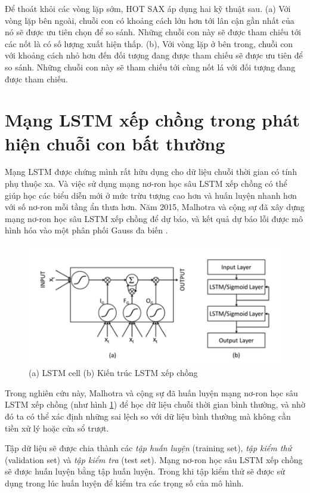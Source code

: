 Để thoát khỏi các vòng lặp sớm, HOT SAX áp dụng hai kỹ thuật sau. (a) Với vòng lặp bên ngoài, chuỗi con có khoảng cách lớn hơn tới lân cận gần nhất của nó sẽ được ưu tiên chọn để so sánh. Những chuỗi con này sẽ được tham chiếu tới các nốt là có số lượng xuất hiện thấp. (b), Với vòng lặp ở bên trong, chuỗi con với khoảng cách nhỏ hơn đến đối tượng đang được tham chiếu sẽ được ưu tiên để so sánh. Những chuỗi con này sẽ tham chiếu tới cùng nốt lá với đối tượng đang được tham chiếu.

\section{Mạng LSTM xếp chồng trong phát hiện chuỗi con bất thường}
Mạng LSTM được chứng mình rất hữu dụng cho dữ liệu chuỗi thời gian có tính phụ thuộc xa. Và việc sử dụng mạng nơ-ron học sâu LSTM xếp chồng có thể giúp học các biểu diễn mới ở mức trừu tượng cao hơn và huấn luyện nhanh hơn với số nơ-ron mỗi tầng ẩn thưa hơn. Năm 2015, Malhotra và cộng sự đã xây dựng mạng nơ-ron học sâu LSTM xếp chồng để dự báo, và kết quả dự báo lỗi được mô hình hóa vào một phân phối Gauss đa biến \cite{st14}.

\begin{figure}[H]
    \centering
    \includegraphics[scale=0.75]{./content/images/3-8.png}
    \caption{(a) LSTM cell (b) Kiến trúc LSTM xếp chồng \cite{st14}}
    \label{fig:3-8}
\end{figure}

Trong nghiên cứu này, Malhotra và cộng sự đã huấn luyện mạng nơ-ron học sâu LSTM xếp chồng (như hình \ref{fig:3-8}) để học dữ liệu chuỗi thời gian bình thường, và nhờ đó ta có thể xác định những sai lệch so với dữ liệu bình thường mà không cần tiền xử lý hoặc cửa sổ trượt.

Tập dữ liệu sẽ được chia thành các \textit{tập huấn luyện} (training set), \textit{tập kiểm thử} (validation set) và \textit{tập kiểm tra} (test set). Mạng nơ-ron học sâu LSTM xếp chồng sẽ được huấn luyện bằng tập huấn luyện. Trong khi tập kiểm thử sẽ được sử dụng trong lúc huấn luyện để kiểm tra các trọng số của mô hình.


